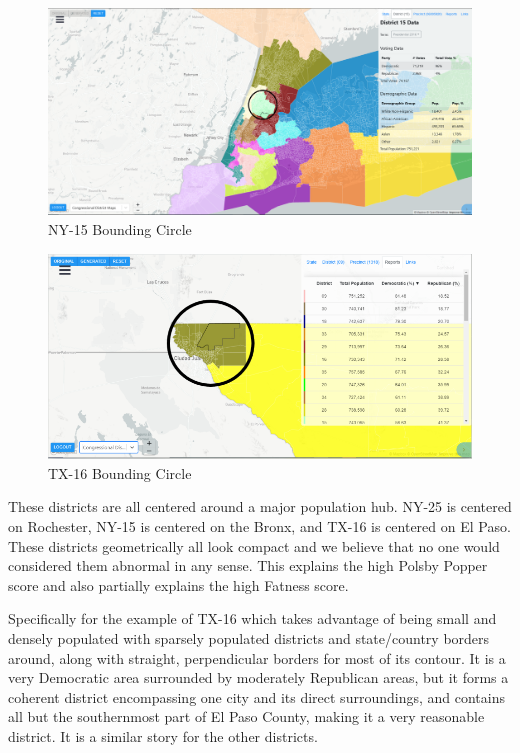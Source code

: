 \documentclass[letterpaper]{article}
\begin{document}
\begin{figure}[H]
	\includegraphics[width=\linewidth]{./figures/NY-15-BoundingCircle.png}
	\caption{NY-15 Bounding Circle}
	\label{fig:ny15boundingCircle}
\end{figure}

\begin{figure}[H]
	\includegraphics[width=\linewidth]{./figures/TX-16-BoundingCircle.png}
	\caption{TX-16 Bounding Circle}
	\label{fig:tx16boundingCircle}
\end{figure}

These districts are all centered around a major population hub. NY-25 is centered on Rochester, NY-15 is centered on the Bronx, and TX-16 is centered on El Paso. These districts geometrically all look compact and we believe that no one would considered them abnormal in any sense. This explains the high Polsby Popper score and also partially explains the high Fatness score. 

Specifically for the example of TX-16 which takes advantage of being small and densely populated with sparsely populated districts and state/country borders around, along with straight, perpendicular borders for most of its contour. It is a very Democratic area surrounded by moderately Republican areas, but it forms a coherent district encompassing one city and its direct surroundings, and contains all but the southernmost part of El Paso County, making it a very reasonable district. It is a similar story for the other districts.
\end{document}
